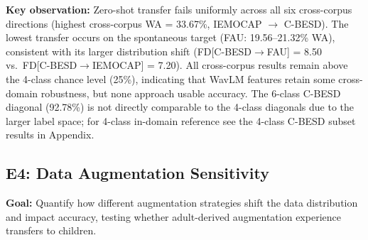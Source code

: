 \noindent\textbf{Key observation:} Zero-shot transfer fails uniformly across all
six cross-corpus directions (highest cross-corpus WA = 33.67\%, IEMOCAP
$\rightarrow$ C-BESD). The lowest transfer occurs on the spontaneous target
(FAU: 19.56--21.32\% WA), consistent with its larger distribution shift
(FD[C-BESD$\rightarrow$FAU] = 8.50 vs.\ FD[C-BESD$\rightarrow$IEMOCAP] = 7.20).
All cross-corpus results remain above the 4-class chance level (25\%), indicating
that WavLM features retain some cross-domain robustness, but none approach
usable accuracy. The 6-class C-BESD diagonal (92.78\%) is not directly
comparable to the 4-class diagonals due to the larger label space; for 4-class
in-domain reference see the 4-class C-BESD subset results in Appendix.

\subsection{E4: Data Augmentation Sensitivity}
\label{ssec:e4}

\textbf{Goal:} Quantify how different augmentation strategies shift the data
distribution and impact accuracy, testing whether adult-derived augmentation
experience transfers to children.

